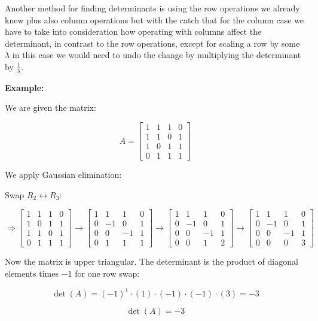 Another method for finding determinants is using the row operations we already knew plus also column operations 
but with the catch that for the column case we have to take into consideration how
operating with columns affect the determinant, in contrast to the row operations, except for scaling
a row by some \(\lambda\) in this case we would need to undo the change by multiplying the determinant
by \(\frac{1}{\lambda}\).
\vspace{\baselineskip}

\textbf{Example: }
\vspace{\baselineskip}

We are given the matrix:

\[
A = \begin{bmatrix}
1 & 1 & 1 & 0 \\
1 & 1 & 0 & 1 \\
1 & 0 & 1 & 1 \\
0 & 1 & 1 & 1
\end{bmatrix}
\]

We apply Gaussian elimination:

Swap \( R_2 \leftrightarrow R_3 \):

\[
\Rightarrow
\begin{bmatrix}
1 & 1 & 1 & 0 \\
1 & 0 & 1 & 1 \\
1 & 1 & 0 & 1 \\
0 & 1 & 1 & 1
\end{bmatrix}
\rightarrow
\begin{bmatrix}
1 & 1 & 1 & 0 \\
0 & -1 & 0 & 1 \\
0 & 0 & -1 & 1 \\
0 & 1 & 1 & 1
\end{bmatrix}
\rightarrow
\begin{bmatrix}
1 & 1 & 1 & 0 \\
0 & -1 & 0 & 1 \\
0 & 0 & -1 & 1 \\
0 & 0 & 1 & 2
\end{bmatrix}
\rightarrow
\begin{bmatrix}
1 & 1 & 1 & 0 \\
0 & -1 & 0 & 1 \\
0 & 0 & -1 & 1 \\
0 & 0 & 0 & 3
\end{bmatrix}
\]

Now the matrix is upper triangular. The determinant is the product of diagonal elements times \( -1 \) for one row swap:

\[
\det(A) = {(-1)}^1 \cdot (1) \cdot (-1) \cdot (-1) \cdot (3) = -3
\]

\[\det(A) = -3\]


